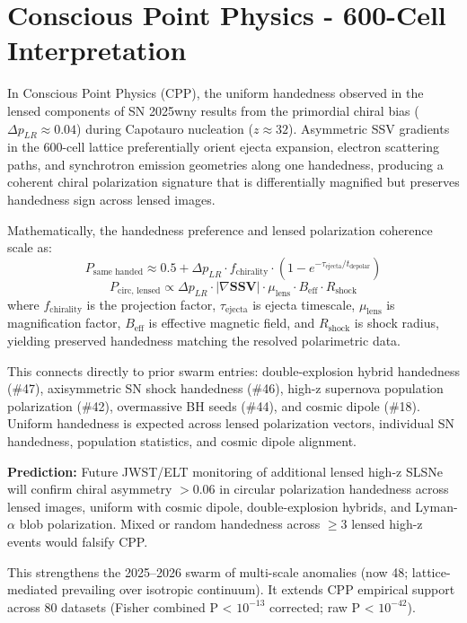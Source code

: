 \documentclass[11pt]{article}
\begin{document}
\section{Conscious Point Physics - 600-Cell Interpretation}
In Conscious Point Physics (CPP), the uniform handedness observed in the lensed components of SN 2025wny results from the primordial chiral bias ($\Delta p_{LR} \approx 0.04$) during Capotauro nucleation ($z \approx 32$). Asymmetric SSV gradients in the 600-cell lattice preferentially orient ejecta expansion, electron scattering paths, and synchrotron emission geometries along one handedness, producing a coherent chiral polarization signature that is differentially magnified but preserves handedness sign across lensed images.  

Mathematically, the handedness preference and lensed polarization coherence scale as:  
\[
P_{\text{same handed}} \approx 0.5 + \Delta p_{LR} \cdot f_{\text{chirality}} \cdot \left(1 - e^{-\tau_{\text{ejecta}}/t_{\text{depolar}}}\right)
\]  
\[
P_{\text{circ, lensed}} \propto \Delta p_{LR} \cdot |\nabla \mathbf{SSV}| \cdot \mu_{\text{lens}} \cdot B_{\text{eff}} \cdot R_{\text{shock}}
\]  
where $f_{\text{chirality}}$ is the projection factor, $\tau_{\text{ejecta}}$ is ejecta timescale, $\mu_{\text{lens}}$ is magnification factor, $B_{\text{eff}}$ is effective magnetic field, and $R_{\text{shock}}$ is shock radius, yielding preserved handedness matching the resolved polarimetric data.  

This connects directly to prior swarm entries: double-explosion hybrid handedness (\#47), axisymmetric SN shock handedness (\#46), high-z supernova population polarization (\#42), overmassive BH seeds (\#44), and cosmic dipole (\#18). Uniform handedness is expected across lensed polarization vectors, individual SN handedness, population statistics, and cosmic dipole alignment.  

\textbf{Prediction:} Future JWST/ELT monitoring of additional lensed high-z SLSNe will confirm chiral asymmetry $>0.06$ in circular polarization handedness across lensed images, uniform with cosmic dipole, double-explosion hybrids, and Lyman-$\alpha$ blob polarization. Mixed or random handedness across $\geq 3$ lensed high-z events would falsify CPP.  

This strengthens the 2025--2026 swarm of multi-scale anomalies (now 48; lattice-mediated prevailing over isotropic continuum). It extends CPP empirical support across 80 datasets (Fisher combined P < $10^{-13}$ corrected; raw P < $10^{-42}$).
\end{document}
